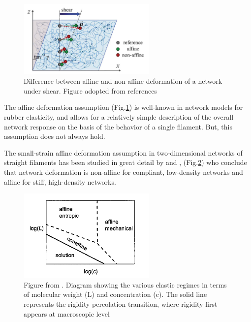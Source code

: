  \begin{figure}[ht]
\begin{center}
\includegraphics[width=0.6\textwidth]{Figures/chapter-intro/nonaffine.png}%

\caption[Affine and non-affine deformations]{ Difference between affine
and non-affine deformation of a network under shear. Figure adopted from
references \citep{wen_non-affine_2012,basu_nonaffine_2011}
}
\label{fig:nonaffine}
\end{center}
\end{figure}
The affine deformation assumption (Fig.\ref{fig:nonaffine}) is well-known in
network models for rubber elasticity, and allows for a relatively
simple description of the overall network response on the basis of the behavior
of a single filament. But, this assumption does not always hold.

The small-strain affine deformation assumption in two-dimensional
networks of straight filaments has
been studied in great detail by \citet{head_distinct_2003,head_mechanical_2005}
and \citet{wilhelm_elasticity_2003}, (Fig.\ref{fig:nonaffine-head}) who conclude
that network deformation is non-affine for compliant, low-density networks
and affine for stiff, high-density networks.
 \begin{figure}[ht]
\begin{center}
\includegraphics[width=0.6\textwidth]{Figures/chapter-intro/nonaffine-head.png}%

\caption[Affine and non-affine phases]{ Figure from
\citet{head_mechanical_2005}. Diagram showing the various elastic regimes in
terms of molecular weight (L) and concentration (c). The solid line represents
the rigidity percolation transition, where rigidity first appears at
macroscopic level}
\label{fig:nonaffine-head}
\end{center}
\end{figure} 

